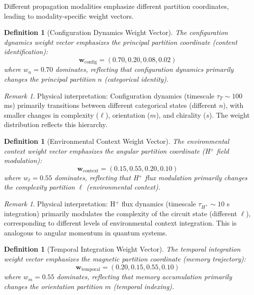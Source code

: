 \documentclass[aps,prd,twocolumn,superscriptaddress,floatfix,nofootinbib]{revtex4-2}
\newtheorem{definition}[theorem]{Definition}
\theoremstyle{remark}
\newtheorem{remark}[theorem]{Remark}
\begin{document}
Different propagation modalities emphasize different partition coordinates, leading to modality-specific weight vectors.

\begin{definition}[Configuration Dynamics Weight Vector]
\label{def:config_weight}
The configuration dynamics weight vector emphasizes the principal partition coordinate (content identification):
\begin{equation}
\mathbf{w}_{\text{config}} = (0.70, 0.20, 0.08, 0.02)
\end{equation}
where $w_n = 0.70$ dominates, reflecting that configuration dynamics primarily changes the principal partition $n$ (categorical identity).
\end{definition}

\begin{remark}
Physical interpretation: Configuration dynamics (timescale $\tau_T \sim 100$ ms) primarily transitions between different categorical states (different $n$), with smaller changes in complexity ($\ell$), orientation ($m$), and chirality ($s$). The weight distribution reflects this hierarchy.
\end{remark}

\begin{definition}[Environmental Context Weight Vector]
\label{def:context_weight}
The environmental context weight vector emphasizes the angular partition coordinate (H$^+$ field modulation):
\begin{equation}
\mathbf{w}_{\text{context}} = (0.15, 0.55, 0.20, 0.10)
\end{equation}
where $w_\ell = 0.55$ dominates, reflecting that H$^+$ flux modulation primarily changes the complexity partition $\ell$ (environmental context).
\end{definition}

\begin{remark}
Physical interpretation: H$^+$ flux dynamics (timescale $\tau_{H^+} \sim 10$ s integration) primarily modulates the complexity of the circuit state (different $\ell$), corresponding to different levels of environmental context integration. This is analogous to angular momentum in quantum systems.
\end{remark}

\begin{definition}[Temporal Integration Weight Vector]
\label{def:temporal_weight}
The temporal integration weight vector emphasizes the magnetic partition coordinate (memory trajectory):
\begin{equation}
\mathbf{w}_{\text{temporal}} = (0.20, 0.15, 0.55, 0.10)
\end{equation}
where $w_m = 0.55$ dominates, reflecting that memory accumulation primarily changes the orientation partition $m$ (temporal indexing).
\end{definition}
\end{document}
